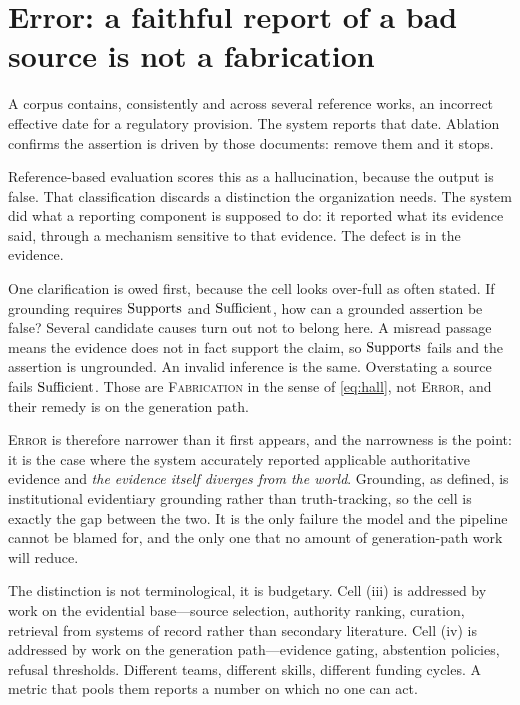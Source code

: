 \section{Error: a faithful report of a bad source is not a fabrication}
\label{sec:cell-iii}

A corpus contains, consistently and across several reference works, an incorrect
effective date for a regulatory provision. The system reports that date. Ablation
confirms the assertion is driven by those documents: remove them and it stops.

Reference-based evaluation scores this as a hallucination, because the output is
false.
That classification discards a distinction the organization needs. The system did
what a reporting component is supposed to do: it reported what its evidence said,
through a mechanism sensitive to that evidence. The defect is in the evidence.

One clarification is owed first, because the cell looks over-full as often stated. If
grounding requires $\operatorname{Supports}$ and $\operatorname{Sufficient}$, how can a grounded assertion be false?
Several candidate causes turn out not to belong here. A misread passage means the evidence
does not in fact support the claim, so $\operatorname{Supports}$ fails and the assertion is ungrounded.
An invalid inference is the same. Overstating a source fails $\operatorname{Sufficient}$. Those are
\textsc{Fabrication} in the sense of \eqref{eq:hall}, not \textsc{Error}, and their remedy
is on the generation path.

\textsc{Error} is therefore narrower than it first appears, and the narrowness is the
point: it is the case where the system accurately reported applicable authoritative
evidence and \emph{the evidence itself diverges from the world}. Grounding, as defined, is
institutional evidentiary grounding rather than truth-tracking, so the cell is exactly the
gap between the two. It is the only failure the model and the pipeline cannot be blamed
for, and the only one that no amount of generation-path work will reduce.

The distinction is not terminological, it is budgetary. Cell (iii) is addressed by
work on the evidential base---source selection, authority ranking, curation,
retrieval from systems of record rather than secondary literature. Cell (iv) is
addressed by work on the generation path---evidence gating, abstention policies,
refusal thresholds. Different teams, different skills, different funding cycles. A metric that pools them reports a number
on which no one can act.

